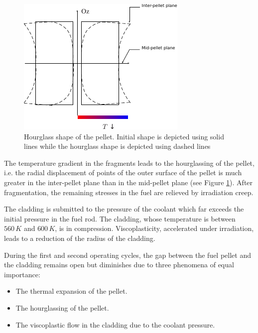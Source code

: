 \begin{figure}[H]
  \centering
  \includegraphics[width=10.cm]{../chapter_00_introduction/figures/HourGlassEffect.pdf}
  \caption{Hourglass shape of the pellet. Initial shape is depicted using solid
  lines while the hourglass shape is depicted using dashed
  lines}
  \label{fig:hho:hourglass}
\end{figure}


The temperature gradient in the fragments leads to the hourglassing of
the pellet, i.e. the radial displacement of points of the outer surface
of the pellet is much greater in the inter-pellet plane than in the
mid-pellet plane (see Figure \ref{fig:hho:hourglass}). After fragmentation,
the remaining stresses in the fuel are relieved by irradiation creep.

The cladding is submitted to the pressure of the coolant which far
exceeds the initial pressure in the fuel rod. The cladding, whose
temperature is between \(560\,K\) and \(600\,K\), is in compression.
Viscoplasticity, accelerated under irradiation, leads to a reduction of
the radius of the cladding.

During the first and second operating cycles, the gap between the fuel
pellet and the cladding remains open but diminishes due to three
phenomena of equal importance:

\begin{itemize}
  \item The thermal expansion of the pellet.
  \item The hourglassing of the pellet.
  \item The viscoplastic flow in the cladding due to the coolant pressure.
\end{itemize}

